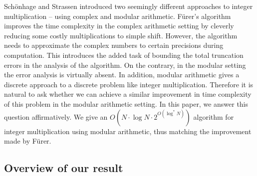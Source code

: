 \documentclass[11pt]{article}
\begin{document}
Sch\"{o}nhage and Strassen introduced two seemingly different
approaches to integer multiplication -- using complex and modular
arithmetic. F\"{u}rer's algorithm improves the time complexity in the
complex arithmetic setting by cleverly reducing some costly
multiplications to simple shift. However, the algorithm
needs to approximate the complex numbers to certain precisions during
computation. This introduces the added task of bounding the total
truncation errors in the analysis of the algorithm. On the contrary,
in the modular setting the error analysis is virtually absent. In
addition, modular arithmetic gives a discrete approach to a discrete
problem like integer multiplication. Therefore it is natural to ask
whether we can achieve a similar improvement in time complexity of
this problem in the modular arithmetic setting. In this paper, we
answer this question affirmatively. We give an $O(N\cdot \log{N}\cdot
2^{O(\log^{*}{N})})$ algorithm for integer multiplication using
modular arithmetic, thus matching the improvement made by F\"{u}rer.

\subsection*{Overview of our result}
\end{document}
